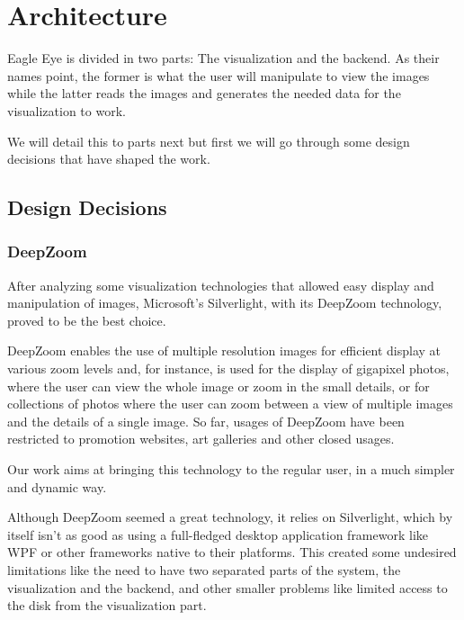 \section{Architecture} %
\label{sec:architecture}

Eagle Eye is divided in two parts: The visualization and the backend. As their names point, the former is what the user will manipulate to view the images while the latter reads the images and generates the needed data for the visualization to work.

We will detail this to parts next but first we will go through some design decisions that have shaped the work. 


\subsection{Design Decisions} %
\label{sub:design_decisions}

\subsubsection{DeepZoom} %
\label{ssub:deepzoom}

After analyzing some visualization technologies that allowed easy display and manipulation of images, Microsoft’s Silverlight, with its DeepZoom technology, proved to be the best choice.

DeepZoom enables the use of multiple resolution images for efficient display at various zoom levels and, for instance, is used for the display of gigapixel photos, where the user can view the whole image or zoom in the small details, or for collections of photos where the user can zoom between a view of multiple images and the details of a single image. So far, usages of DeepZoom have been restricted to promotion websites, art galleries and other closed usages.

Our work aims at bringing this technology to the regular user, in a much simpler and dynamic way.

Although DeepZoom seemed a great technology, it relies on Silverlight, which by itself isn't as good as using a full-fledged desktop application framework like \ac{WPF} or other frameworks native to their platforms. This created some undesired limitations like the need to have two separated parts of the system, the visualization and the backend, and other smaller problems like limited access to the disk from the visualization part.

